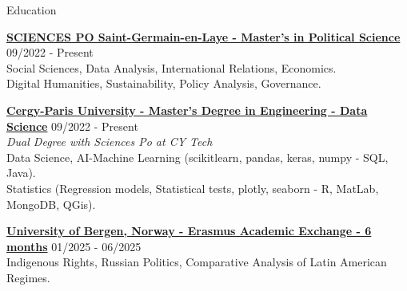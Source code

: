 \documentclass[a4paper]{resume} %
\begin{document}
  


\begin{rSection}{Education}

{\bf \href{https://www.sciencespo-saintgermainenlaye.fr/en/}{SCIENCES PO Saint-Germain-en-Laye - Master’s in Political Science}} \hfill {09/2022 - Present}
\\
Social Sciences, Data Analysis, International Relations, Economics.
\\
Digital Humanities, Sustainability, Policy Analysis, Governance.

{\bf \href{https://cytech.cyu.fr/}{Cergy-Paris University - Master’s Degree in Engineering - Data Science}} \hfill {09/2022 - Present}
\\ 
 \textit{Dual Degree with Sciences Po at CY Tech}
\\
Data Science, AI-Machine Learning (scikitlearn, pandas, keras, numpy - SQL, Java).
\\
Statistics (Regression models, Statistical tests, plotly, seaborn - R, MatLab, MongoDB, QGis).

{\bf \href{https://www.uib.no/en}{University of Bergen, Norway - Erasmus Academic Exchange - 6 months}} \hfill {01/2025 - 06/2025}
\\
Indigenous Rights, Russian Politics, Comparative Analysis of Latin American Regimes.
\end{rSection} 

\end{document}
